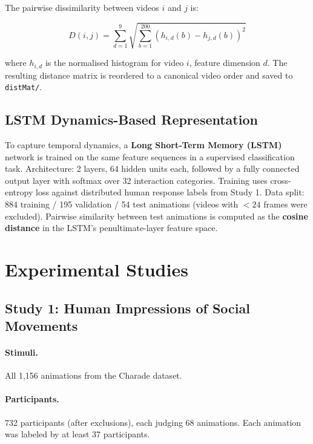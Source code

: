 \documentclass[11pt,a4paper]{article}
\begin{document}
\noindent The pairwise dissimilarity between videos $i$ and $j$ is:

\begin{equation}
    D(i,j) = \sum_{d=1}^{9} \sqrt{ \sum_{b=1}^{200} \left( h_{i,d}(b) - h_{j,d}(b) \right)^2 }
\end{equation}

\noindent where $h_{i,d}$ is the normalised histogram for video $i$, feature dimension $d$. The resulting distance matrix is reordered to a canonical video order and saved to \texttt{distMat/}.

\subsection{LSTM Dynamics-Based Representation}

To capture temporal dynamics, a \textbf{Long Short-Term Memory (LSTM)} network is trained on the same feature sequences in a supervised classification task. Architecture: 2 layers, 64 hidden units each, followed by a fully connected output layer with softmax over 32 interaction categories. Training uses cross-entropy loss against distributed human response labels from Study 1. Data split: 884 training / 195 validation / 54 test animations (videos with $< 24$ frames were excluded). Pairwise similarity between test animations is computed as the \textbf{cosine distance} in the LSTM's penultimate-layer feature space.

\section{Experimental Studies}

\subsection{Study 1: Human Impressions of Social Movements}

\paragraph{Stimuli.} All 1,156 animations from the Charade dataset.

\paragraph{Participants.} 732 participants (after exclusions), each judging 68 animations. Each animation was labeled by at least 37 participants.
\end{document}
